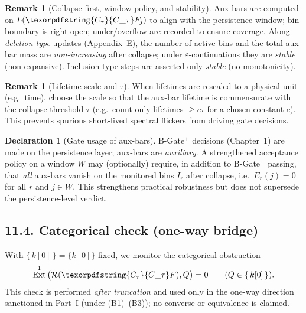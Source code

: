 \documentclass[11pt]{article}
\DeclareMathOperator{\Ext}{Ext}
\DeclareRobustCommand{\hyp}{\nobreakdash-}
\newcommand{\Rfun}{\mathcal{R}}
\numberwithin{equation}{section}
\theoremstyle{definition}
\newtheorem{remark}[theorem]{Remark}
\newtheorem{declaration}[theorem]{Declaration}
\DeclareRobustCommand{\Ctau}{\texorpdfstring{\ensuremath{C_{\tau}}}{C\_\tau}}
\DeclareRobustCommand{\Qtest}{\{\,k[0]\,\}}
\begin{document}
\begin{remark}[Collapse-first, window policy, and stability]
Aux-bars are computed on $L(\Ctau F_j)$ to align with the persistence window; bin boundary is right-open; under/overflow are recorded to ensure coverage. Along \emph{deletion-type} updates (Appendix~E), the number of active bins and the total aux-bar mass are \emph{non\hyp increasing} after collapse; under \(\varepsilon\)\hyp continuations they are \emph{stable} (non\hyp expansive). Inclusion-type steps are asserted only \emph{stable} (no monotonicity).
\end{remark}

\begin{remark}[Lifetime scale and $\tau$]
When lifetimes are rescaled to a physical unit (e.g.\ time), choose the scale so that the aux-bar lifetime is commensurate with the collapse threshold $\tau$ (e.g.\ count only lifetimes $\ge c\tau$ for a chosen constant $c$). This prevents spurious short\hyp lived spectral flickers from driving gate decisions.
\end{remark}

\begin{declaration}[Gate usage of aux-bars]\label{dec:11-aux-gate}
B\hyp Gate\(^{+}\) decisions (Chapter~1) are made on the persistence layer; aux-bars are \emph{auxiliary}. A strengthened acceptance policy on a window $W$ may (optionally) require, in addition to B\hyp Gate\(^{+}\) passing, that \emph{all} aux-bars vanish on the monitored bins $I_r$ after collapse, i.e.\ $E_r(j)=0$ for all $r$ and $j\in W$. This strengthens practical robustness but does not supersede the persistence\hyp level verdict.
\end{declaration}

\subsection*{11.4. Categorical check (one-way bridge)}
With $\Qtest=\{k[0]\}$ fixed, we monitor the categorical obstruction
\[
  \Ext^1\big(\Rfun(\Ctau F),Q\big)=0\qquad(Q\in\Qtest).
\]
This check is performed \emph{after truncation} and used only in the one-way direction sanctioned in Part~I (under (B1)–(B3)); no converse or equivalence is claimed.
\end{document}
